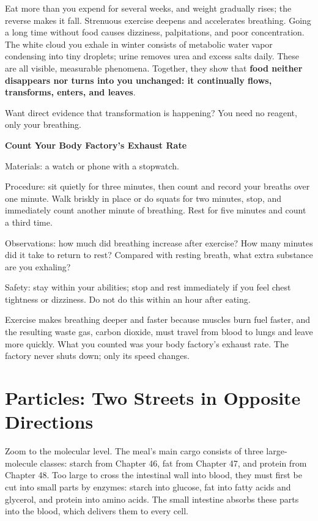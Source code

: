 Eat more than you expend for several weeks, and weight gradually rises; the reverse makes it fall. Strenuous exercise deepens and accelerates breathing. Going a long time without food causes dizziness, palpitations, and poor concentration. The white cloud you exhale in winter consists of metabolic water vapor condensing into tiny droplets; urine removes urea and excess salts daily. These are all visible, measurable phenomena. Together, they show that \textbf{food neither disappears nor turns into you unchanged: it continually flows, transforms, enters, and leaves}.

Want direct evidence that transformation is happening? You need no reagent, only your breathing.

\begin{shiyan}
\textbf{Count Your Body Factory's Exhaust Rate}

Materials: a watch or phone with a stopwatch.

Procedure: sit quietly for three minutes, then count and record your breaths over one minute. Walk briskly in place or do squats for two minutes, stop, and immediately count another minute of breathing. Rest for five minutes and count a third time.

Observations: how much did breathing increase after exercise? How many minutes did it take to return to rest? Compared with resting breath, what extra substance are you exhaling?

Safety: stay within your abilities; stop and rest immediately if you feel chest tightness or dizziness. Do not do this within an hour after eating.
\end{shiyan}

Exercise makes breathing deeper and faster because muscles burn fuel faster, and the resulting waste gas, carbon dioxide, must travel from blood to lungs and leave more quickly. What you counted was your body factory's exhaust rate. The factory never shuts down; only its speed changes.

\section{Particles: Two Streets in Opposite Directions}

Zoom to the molecular level. The meal's main cargo consists of three large-molecule classes: starch from Chapter 46, fat from Chapter 47, and protein from Chapter 48. Too large to cross the intestinal wall into blood, they must first be cut into small parts by enzymes: starch into glucose, fat into fatty acids and glycerol, and protein into amino acids. The small intestine absorbs these parts into the blood, which delivers them to every cell.

